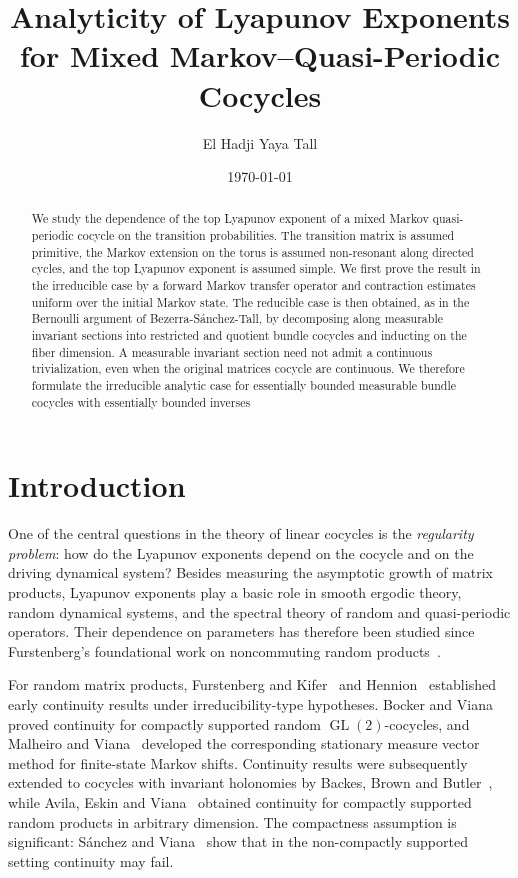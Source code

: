 \documentclass[11pt,a4paper]{amsart}
\title{Analyticity of Lyapunov Exponents for Mixed
Markov--Quasi-Periodic Cocycles}
\author[E.H. Y. Tall]{El Hadji Yaya Tall}
\date{\today}
\begin{document}
\begin{abstract}
We study the dependence of the top Lyapunov exponent of a mixed
Markov quasi-periodic cocycle on the transition probabilities.
The transition matrix is assumed primitive, the Markov extension on
the torus is assumed non-resonant along directed cycles, and the top
Lyapunov exponent is assumed simple.  We first prove the result in the
irreducible case by a forward Markov transfer operator and contraction
estimates uniform over the initial Markov state.  The reducible case is
then obtained, as in the Bernoulli argument of
Bezerra-Sánchez-Tall, by decomposing along measurable invariant
sections into restricted and quotient bundle cocycles and inducting on
the fiber dimension.  A measurable invariant section need not admit a
continuous trivialization, even when the original matrices cocycle are
continuous.  We therefore formulate the irreducible analytic case for
essentially bounded measurable bundle cocycles with essentially bounded
inverses
\end{abstract}
\maketitle
\tableofcontents
\section{Introduction}

One of the central questions in the theory of linear cocycles is the
\emph{regularity problem}: how do the Lyapunov exponents depend on the
cocycle and on the driving dynamical system?  Besides measuring the
asymptotic growth of matrix products, Lyapunov exponents play a basic
role in smooth ergodic theory, random dynamical systems, and the
spectral theory of random and quasi-periodic operators.  Their
dependence on parameters has therefore been studied since
Furstenberg's foundational work on noncommuting random
products~\cite{Furstenberg63}.

For random matrix products, Furstenberg and Kifer~\cite{FK} and
Hennion~\cite{Hennion84} established early continuity results under
irreducibility-type hypotheses.  Bocker and Viana~\cite{BV17}
proved continuity for compactly supported random
\(\operatorname{GL}(2)\)-cocycles, and Malheiro and Viana~\cite{MV}
developed the corresponding stationary measure vector method for
finite-state Markov shifts.  Continuity results were subsequently
extended to cocycles with invariant holonomies by
Backes, Brown and Butler~\cite{BBB18}, while
Avila, Eskin and Viana~\cite{AEV23} obtained continuity for compactly
supported random products in arbitrary dimension.  The compactness
assumption is significant: Sánchez and Viana~\cite{SV20} show that in the
non-compactly supported setting continuity may fail.
\end{document}
